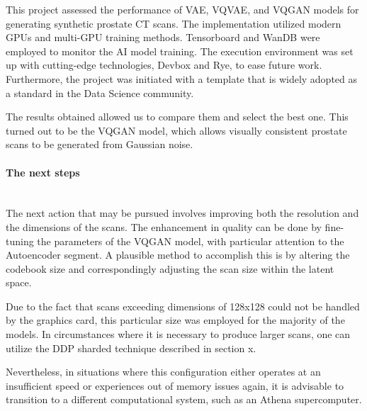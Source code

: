 This project assessed the performance of VAE, VQVAE, and VQGAN models for generating synthetic prostate CT scans. The implementation utilized modern GPUs and multi-GPU training methods. Tensorboard and WanDB were employed to monitor the AI model training. The execution environment was set up with cutting-edge technologies, Devbox and Rye, to ease future work. Furthermore, the project was initiated with a template that is widely adopted as a standard in the Data Science community.

 The results obtained allowed us to compare them and select the best one. This turned out to be the VQGAN model, which allows visually consistent prostate scans to be generated from Gaussian noise. 

\paragraph{The next steps}\mbox{}\\
\indent The next action that may be pursued involves improving both the resolution and the dimensions of the scans. The enhancement in quality can be done by fine-tuning the parameters of the VQGAN model, with particular attention to the Autoencoder segment. A plausible method to accomplish this is by altering the codebook size and correspondingly adjusting the scan size within the latent space.

Due to the fact that scans exceeding dimensions of 128x128 could not be handled by the graphics card, this particular size was employed for the majority of the models. In circumstances where it is necessary to produce larger scans, one can utilize the DDP sharded technique described in section x. 

Nevertheless, in situations where this configuration either operates at an insufficient speed or experiences out of memory issues again, it is advisable to transition to a different computational system, such as an Athena supercomputer.

